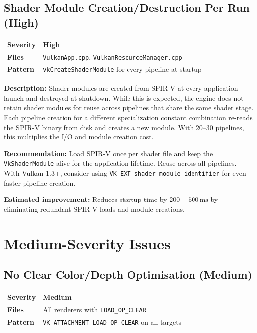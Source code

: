 \documentclass[a4paper,10pt]{article}
\newcommand{\ms}{\ensuremath{\,\text{ms}}}
\newcommand{\severity}[1]{%
  \ifstrequal{#1}{Critical}{\textcolor{critical}{\textbf{#1}}}{%
  \ifstrequal{#1}{High}{\textcolor{high}{\textbf{#1}}}{%
  \ifstrequal{#1}{Medium}{\textcolor{medium}{\textbf{#1}}}{%
  \ifstrequal{#1}{Low}{\textcolor{low}{\textbf{#1}}}{#1}}}}}
\begin{document}
\subsection{Shader Module Creation/Destruction Per Run (High)}

\begin{tabular}{ll}
\textbf{Severity} & \severity{High} \\
\textbf{Files}     & \texttt{VulkanApp.cpp}, \texttt{VulkanResourceManager.cpp} \\
\textbf{Pattern}   & \texttt{vkCreateShaderModule} for every pipeline at
                      startup \\
\end{tabular}

\vspace{0.5em}
\noindent
\textbf{Description:} Shader modules are created from SPIR-V at every
application launch and destroyed at shutdown. While this is expected, the
engine does not retain shader modules for reuse across pipelines that share
the same shader stage. Each pipeline creation for a different specialization
constant combination re-reads the SPIR-V binary from disk and creates a new
module. With 20--30 pipelines, this multiplies the I/O and module creation
cost.

\noindent\textbf{Recommendation:} Load SPIR-V once per shader file and keep the
\texttt{VkShaderModule} alive for the application lifetime. Reuse across all
pipelines. With Vulkan 1.3+, consider using \texttt{VK\_EXT\_shader\_module\_identifier}
for even faster pipeline creation.

\noindent\textbf{Estimated improvement:} Reduces startup time by
$200{-}500\ms$ by eliminating redundant SPIR-V loads and module creations.

\section{Medium-Severity Issues}

\subsection{No Clear Color/Depth Optimisation (Medium)}

\begin{tabular}{ll}
\textbf{Severity} & \severity{Medium} \\
\textbf{Files}     & All renderers with \texttt{LOAD\_OP\_CLEAR} \\
\textbf{Pattern}   & \texttt{VK\_ATTACHMENT\_LOAD\_OP\_CLEAR} on all targets \\
\end{tabular}
\end{document}
